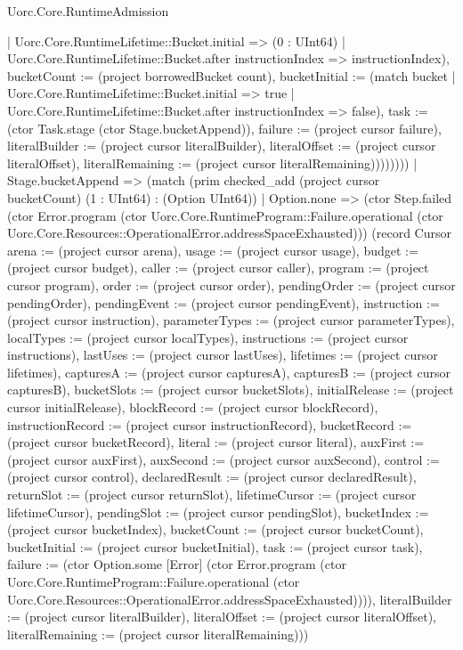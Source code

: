 \begin{lexlean}{Uorc.Core.RuntimeAdmission}
\begin{semanticmodule}
{{                  | Uorc.Core.RuntimeLifetime::Bucket.initial => (0 : UInt64)
                  | Uorc.Core.RuntimeLifetime::Bucket.after instructionIndex => instructionIndex), bucketCount := (project borrowedBucket count), bucketInitial := (match bucket
                  | Uorc.Core.RuntimeLifetime::Bucket.initial => true
                  | Uorc.Core.RuntimeLifetime::Bucket.after instructionIndex => false), task := (ctor Task.stage (ctor Stage.bucketAppend)), failure := (project cursor failure), literalBuilder := (project cursor literalBuilder), literalOffset := (project cursor literalOffset), literalRemaining := (project cursor literalRemaining)})))))))
      | Stage.bucketAppend => (match (prim checked_add (project cursor bucketCount) (1 : UInt64) : (Option UInt64))
        | Option.none => (ctor Step.failed (ctor Error.program (ctor Uorc.Core.RuntimeProgram::Failure.operational (ctor Uorc.Core.Resources::OperationalError.addressSpaceExhausted))) (record Cursor {arena := (project cursor arena), usage := (project cursor usage), budget := (project cursor budget), caller := (project cursor caller), program := (project cursor program), order := (project cursor order), pendingOrder := (project cursor pendingOrder), pendingEvent := (project cursor pendingEvent), instruction := (project cursor instruction), parameterTypes := (project cursor parameterTypes), localTypes := (project cursor localTypes), instructions := (project cursor instructions), lastUses := (project cursor lastUses), lifetimes := (project cursor lifetimes), capturesA := (project cursor capturesA), capturesB := (project cursor capturesB), bucketSlots := (project cursor bucketSlots), initialRelease := (project cursor initialRelease), blockRecord := (project cursor blockRecord), instructionRecord := (project cursor instructionRecord), bucketRecord := (project cursor bucketRecord), literal := (project cursor literal), auxFirst := (project cursor auxFirst), auxSecond := (project cursor auxSecond), control := (project cursor control), declaredResult := (project cursor declaredResult), returnSlot := (project cursor returnSlot), lifetimeCursor := (project cursor lifetimeCursor), pendingSlot := (project cursor pendingSlot), bucketIndex := (project cursor bucketIndex), bucketCount := (project cursor bucketCount), bucketInitial := (project cursor bucketInitial), task := (project cursor task), failure := (ctor Option.some [Error] (ctor Error.program (ctor Uorc.Core.RuntimeProgram::Failure.operational (ctor Uorc.Core.Resources::OperationalError.addressSpaceExhausted)))), literalBuilder := (project cursor literalBuilder), literalOffset := (project cursor literalOffset), literalRemaining := (project cursor literalRemaining)}))
}
\end{semanticmodule}
\end{lexlean}
